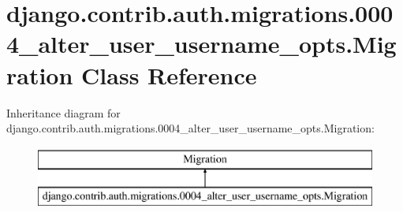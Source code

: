 \hypertarget{classdjango_1_1contrib_1_1auth_1_1migrations_1_10004__alter__user__username__opts_1_1_migration}{}\section{django.\+contrib.\+auth.\+migrations.0004\+\_\+alter\+\_\+user\+\_\+username\+\_\+opts.Migration Class Reference}
\label{classdjango_1_1contrib_1_1auth_1_1migrations_1_10004__alter__user__username__opts_1_1_migration}
Inheritance diagram for django.\+contrib.\+auth.\+migrations.0004\+\_\+alter\+\_\+user\+\_\+username\+\_\+opts.Migration\+:\begin{figure}[H]
\begin{center}
\leavevmode
\includegraphics[height=2.000000cm]{classdjango_1_1contrib_1_1auth_1_1migrations_1_10004__alter__user__username__opts_1_1_migration}
\end{center}
\end{figure}
